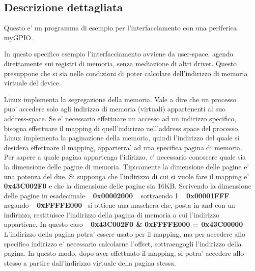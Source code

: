 \subsection{Descrizione dettagliata}
Questo e' un programma di esempio per l'interfacciamento con una periferica my\+G\+P\+I\+O. 

In questo specifico esempio l'interfacciamento avviene da user-\/space, agendo direttamente sui registri di memoria, senza mediazione di altri driver. Questo presuppone che si sia nelle condizioni di poter calcolare dell'indirizzo di memoria virtuale del device. ~\newline


Linux implementa la segregazione della memoria. Vale a dire che un processo puo' accedere solo agli indirizzo di memoria (virtuali) appartenenti al suo address-\/space. Se e' necessario effettuare un accesso ad un indirizzo specifico, bisogna effettuare il mapping di quell'indirizzo nell'address space del processo. Linux implementa la paginazione della memoria, quindi l'indirizzo del quale si desidera effettuare il mapping, apparterra' ad una specifica pagina di memoria. Per sapere a quale pagina appartenga l'idirizzo, e' necessario conoscere quale sia la dimensione delle pagine di memoria. Tipicamente la dimensione delle pagine e' una potenza del due. Si supponga che l'indirizzo di cui si vuole fare il mapping e' {\bfseries 0x43\+C002\+F0} e che la dimensione delle pagine sia 16\+K\+B. Scrivendo la dimensione delle pagine in esadecimale ~\newline
 {\bfseries 0x00002000} ~\newline
 sottraendo 1 ~\newline
 {\bfseries 0x00001\+F\+F\+F} ~\newline
 negando ~\newline
 {\bfseries 0x\+F\+F\+F\+F\+E000}~\newline
 si ottiene una maschera che, posta in and con un indirizzo, restituisce l'indirizzo della pagina di memoria a cui l'indirizzo appartiene. In questo caso ~\newline
 {\bfseries 0x43\+C002\+F0 \& 0x\+F\+F\+F\+F\+E000 = 0x43\+C00000} ~\newline
 L'indirizzo della pagina potra' essere usato per il mapping, ma per accedere allo specifico indirizzo e' necessario calcolarne l'offset, sottraengogli l'indirizzo della pagina. In questo modo, dopo aver effettuato il mapping, si potra' accedere allo stesso a partire dall'indirizzo virtuale della pagina stessa. 

